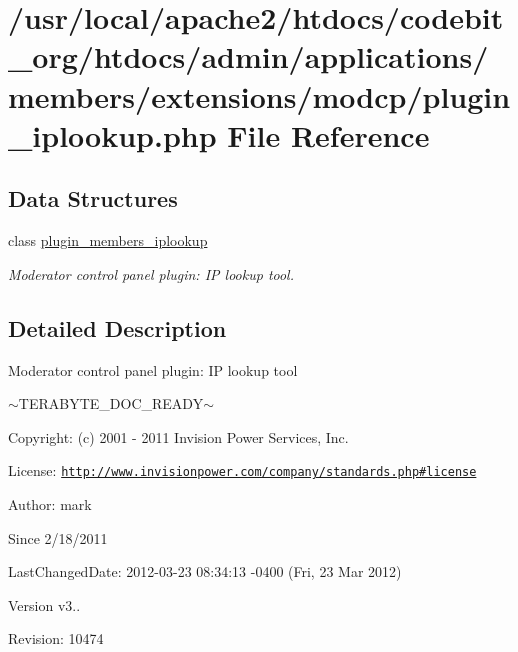 \hypertarget{plugin__iplookup_8php}{\section{/usr/local/apache2/htdocs/codebit\-\_\-org/htdocs/admin/applications/members/extensions/modcp/plugin\-\_\-iplookup.php File Reference}
\label{plugin__iplookup_8php}
}
\subsection*{Data Structures}
\begin{DoxyCompactItemize}
\item 
class \hyperlink{classplugin__members__iplookup}{plugin\-\_\-members\-\_\-iplookup}
\begin{DoxyCompactList}\small\item\em Moderator control panel plugin\-: I\-P lookup tool. \end{DoxyCompactList}\end{DoxyCompactItemize}


\subsection{Detailed Description}
\begin{DoxyVerb}  Moderator control panel plugin: IP lookup tool
\end{DoxyVerb}
 $\sim$\-T\-E\-R\-A\-B\-Y\-T\-E\-\_\-\-D\-O\-C\-\_\-\-R\-E\-A\-D\-Y$\sim$ \begin{DoxyParagraph}{Copyright\-:}
(c) 2001 -\/ 2011 Invision Power Services, Inc.
\end{DoxyParagraph}
\begin{DoxyParagraph}{License\-:}
\href{http://www.invisionpower.com/company/standards.php#license}{\tt http\-://www.\-invisionpower.\-com/company/standards.\-php\#license}
\end{DoxyParagraph}
\begin{DoxyParagraph}{Author\-:}
mark 
\end{DoxyParagraph}
\begin{DoxySince}{Since}
2/18/2011 
\end{DoxySince}
\begin{DoxyParagraph}{Last\-Changed\-Date\-:}
2012-\/03-\/23 08\-:34\-:13 -\/0400 (Fri, 23 Mar 2012) 
\end{DoxyParagraph}
\begin{DoxyVersion}{Version}
v3.. 
\end{DoxyVersion}
\begin{DoxyParagraph}{Revision\-:}
10474 
\end{DoxyParagraph}
